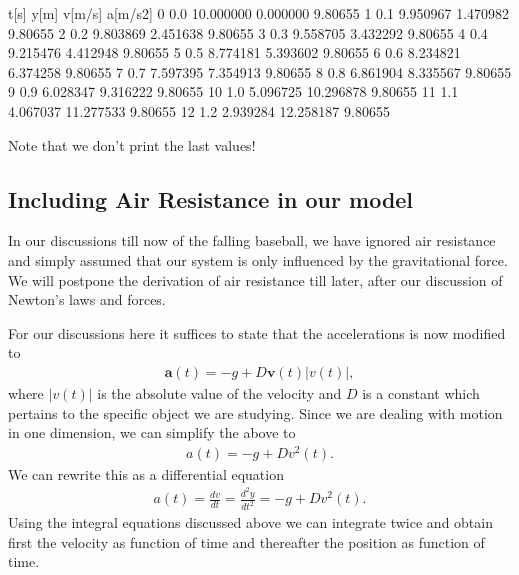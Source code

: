 \documentclass[letterpaper,10pt,english]{sphinxmanual}
\begin{document}
\begin{sphinxVerbatim}[commandchars=\\\{\}]
    t[s]       y[m]     v[m/s]  a[m/s\PYGZca{}2]
0    0.0  10.000000   0.000000  \PYGZhy{}9.80655
1    0.1   9.950967  \PYGZhy{}1.470982  \PYGZhy{}9.80655
2    0.2   9.803869  \PYGZhy{}2.451638  \PYGZhy{}9.80655
3    0.3   9.558705  \PYGZhy{}3.432292  \PYGZhy{}9.80655
4    0.4   9.215476  \PYGZhy{}4.412948  \PYGZhy{}9.80655
5    0.5   8.774181  \PYGZhy{}5.393602  \PYGZhy{}9.80655
6    0.6   8.234821  \PYGZhy{}6.374258  \PYGZhy{}9.80655
7    0.7   7.597395  \PYGZhy{}7.354913  \PYGZhy{}9.80655
8    0.8   6.861904  \PYGZhy{}8.335567  \PYGZhy{}9.80655
9    0.9   6.028347  \PYGZhy{}9.316222  \PYGZhy{}9.80655
10   1.0   5.096725 \PYGZhy{}10.296878  \PYGZhy{}9.80655
11   1.1   4.067037 \PYGZhy{}11.277533  \PYGZhy{}9.80655
12   1.2   2.939284 \PYGZhy{}12.258187  \PYGZhy{}9.80655
\end{sphinxVerbatim}

Note that we don’t print the last values!


\subsection{Including Air Resistance in our model}
\label{\detokenize{chapter2:including-air-resistance-in-our-model}}
In our discussions till now of the falling baseball, we have ignored
air resistance and simply assumed that our system is only influenced
by the gravitational force.  We will postpone the derivation of air
resistance till later, after our discussion of Newton’s laws and
forces.

For our discussions here it suffices to state that the accelerations is now modified to
\begin{equation*}
\begin{split}
\boldsymbol{a}(t) = -g +D\boldsymbol{v}(t)\vert v(t)\vert,
\end{split}
\end{equation*}
where \(\vert v(t)\vert\) is the absolute value of the velocity and \(D\) is a constant which pertains to the specific object we are studying.
Since we are dealing with motion in one dimension, we can simplify the above to
\begin{equation*}
\begin{split}
a(t) = -g +Dv^2(t).
\end{split}
\end{equation*}
We can rewrite this as a differential equation
\begin{equation*}
\begin{split}
a(t) = \frac{dv}{dt}=\frac{d^2y}{dt^2}= -g +Dv^2(t).
\end{split}
\end{equation*}
Using the integral equations discussed above we can integrate twice
and obtain first the velocity as function of time and thereafter the
position as function of time.
\end{document}
